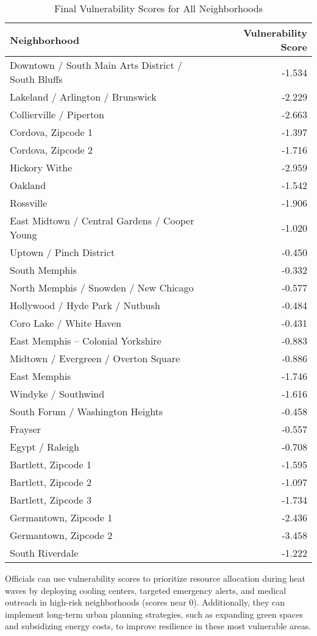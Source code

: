 \documentclass{article}
\begin{document}
\begin{table}[h]
\centering


\begin{tabular}{lr}
\toprule
                                      Neighborhood &  Vulnerability Score \\
\midrule
Downtown / South Main Arts District / South Bluffs &               -1.534 \\
Lakeland / Arlington / Brunswick &               -2.229 \\
Collierville / Piperton &               -2.663 \\
Cordova, Zipcode 1 &               -1.397 \\
Cordova, Zipcode 2 &               -1.716 \\
Hickory Withe &               -2.959 \\
Oakland &               -1.542 \\
Rossville &               -1.906 \\
East Midtown / Central Gardens / Cooper Young &               -1.020 \\
Uptown / Pinch District &               -0.450 \\
South Memphis &               -0.332 \\
North Memphis / Snowden / New Chicago &               -0.577 \\
Hollywood / Hyde Park / Nutbush &               -0.484 \\
Coro Lake / White Haven &               -0.431 \\
East Memphis – Colonial Yorkshire &               -0.883 \\
Midtown / Evergreen / Overton Square &               -0.886 \\
East Memphis &               -1.746 \\
Windyke / Southwind &               -1.616 \\
South Forum / Washington Heights &               -0.458 \\
Frayser &               -0.557 \\
Egypt / Raleigh &               -0.708 \\
Bartlett, Zipcode 1 &               -1.595 \\
Bartlett, Zipcode 2 &               -1.097 \\
Bartlett, Zipcode 3 &               -1.734 \\
Germantown, Zipcode 1 &               -2.436 \\
Germantown, Zipcode 2 &               -3.458 \\
South Riverdale &               -1.222 \\
\bottomrule
\end{tabular}
\caption{Final Vulnerability Scores for All Neighborhoods}
\label{tab:all_vulnerability_scores}
\end{table}
Officials can use vulnerability scores to prioritize resource allocation during heat waves by deploying cooling centers, targeted emergency alerts, and medical outreach in high-risk neighborhoods (scores near 0). Additionally, they can implement long-term urban planning strategies, such as expanding green spaces and subsidizing energy costs, to improve resilience in these most vulnerable areas.
\end{document}
